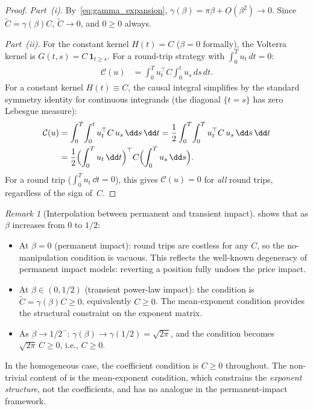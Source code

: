 \documentclass[12pt]{article}
\theoremstyle{definition}
\theoremstyle{remark}
\newtheorem{remark}[theorem]{Remark}
\newcommand{\bC}{\widetilde{C}}
\begin{document}
\begin{proof}
\emph{Part~(i).}
By~\eqref{eq:gamma_expansion}, $\gamma(\beta) = \pi\beta + O(\beta^2)\to 0$.
Since $\bC = \gamma(\beta)C$, $\bC\to 0$, and $0\ge 0$ always.

\smallskip\noindent
\emph{Part~(ii).}
For the constant kernel $H(t) = C$ ($\beta=0$ formally), the Volterra kernel is
$G(t,s) = C\,\mathbf{1}_{t\ge s}$.  For a round-trip strategy with
$\int_0^T u_t\,dt = 0$:
\begin{align*}
  \mathcal{C}(u) &= \int_0^T u_t^\top C\int_0^t u_s\,ds\,dt.
\end{align*}
For a constant kernel $H(t) \equiv C$, the causal integral simplifies by
the standard symmetry identity for continuous integrands
(the diagonal $\{t=s\}$ has zero Lebesgue measure):
\begin{align*}
  \mathcal{C}(u) &= \int_0^T\!\int_0^t u_t^\top C\,u_s\,\dd s\,\dd t
  = \frac{1}{2}\int_0^T\!\int_0^T u_t^\top C\,u_s\,\dd s\,\dd t\\
  &= \frac{1}{2}\Bigl(\int_0^T u_t\,\dd t\Bigr)^\top C\Bigl(\int_0^T u_s\,\dd s\Bigr).
\end{align*}
For a round trip ($\int_0^T u_t\,\dd t = 0$), this gives $\mathcal{C}(u) = 0$
for \emph{all} round trips, regardless of the sign of~$C$.
\end{proof}

\begin{remark}[Interpolation between permanent and transient impact]\label{rem:interpolation}
 shows that as $\beta$ increases from $0$ to $1/2$:
\begin{itemize}[nosep]
\item At $\beta=0$ (permanent impact): round trips are costless for any $C$,
  so the no-manipulation condition is vacuous. This reflects the well-known
  degeneracy of permanent impact models: reverting a position fully undoes
  the price impact.
\item At $\beta\in(0,1/2)$ (transient power-law impact): the condition is
  $\bC = \gamma(\beta)C \ge 0$, equivalently $C\ge 0$.  The mean-exponent
  condition provides the structural constraint on the exponent matrix.
\item As $\beta\to 1/2^-$: $\gamma(\beta)\to \gamma(1/2) = \sqrt{2\pi}$,
  and the condition becomes $\sqrt{2\pi}\,C\ge 0$, i.e., $C\ge 0$.
\end{itemize}
In the homogeneous case, the coefficient condition is $C\ge 0$ throughout.
The non-trivial content of  is the mean-exponent condition,
which constrains the \emph{exponent structure}, not the coefficients, and
has no analogue in the permanent-impact framework.
\end{remark}
\end{document}
